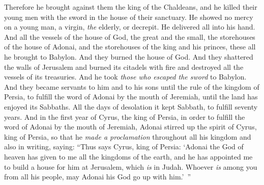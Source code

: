 \begin{biblechapter}
 Therefore he brought against them the king of the Chaldeans, and he killed their young men with the sword in the house of their sanctuary. He showed no mercy on a young man, a virgin, \textit{the} elderly, or decrepit. He delivered all into his hand.
\verse And all the vessels of the house of God, the great and the small, the storehouses of the house of Adonai, and the storehouses of the king and his princes, these all he brought to Babylon.
\verse And they burned the house of God. And they shattered the walls of Jerusalem and burned its citadels with fire and destroyed all the vessels of its treasuries.
\verse And he took \textit{those who escaped the sword} to Babylon. And they became servants to him and to his sons until the rule of the kingdom of Persia,
\verse to fulfill the word of Adonai by the mouth of Jeremiah, until the land has enjoyed its Sabbaths. All the days of desolation it kept Sabbath, to fulfill seventy years.
 And in the first year of Cyrus, the king of Persia, in order to fulfill the word of Adonai by the mouth of Jeremiah, Adonai stirred up the spirit of Cyrus, king of Persia, so that he \textit{made a proclamation} throughout all his kingdom and also in writing, saying:
\verse “Thus says Cyrus, king of Persia: ‘Adonai the God of heaven has given to me all the kingdoms of the earth, and he has appointed me to build a house for him at Jerusalem, which \textit{is} in Judah. Whoever \textit{is} among you from all his people, may Adonai his God go up with him.’ ”
\end{biblechapter}

